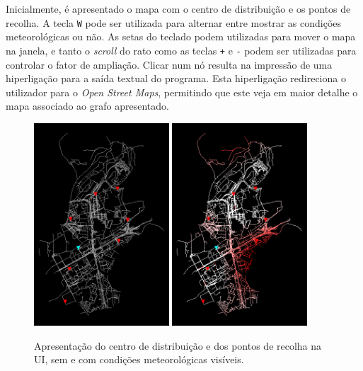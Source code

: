 \documentclass[12pt, a4paper]{article}
\begin{document}
Inicialmente, é apresentado o mapa com o centro de distribuição e os pontos de recolha. A tecla
\texttt{W} pode ser utilizada para alternar entre mostrar as condições meteorológicas ou não.
As setas do teclado podem utilizadas para mover o mapa na janela, e tanto o \emph{scroll} do rato
como as teclas \texttt{+} e \texttt{-} podem ser utilizadas para controlar o fator de ampliação.
Clicar num nó resulta na impressão de uma hiperligação para a saída textual do programa. Esta
hiperligação redireciona o utilizador para o \emph{Open Street Maps}, permitindo que este veja em
maior detalhe o mapa associado ao grafo apresentado.

\begin{figure}[H]
    \centering
    \includegraphics[width=0.45\textwidth]{res/PontosImportantes.png}
    \includegraphics[width=0.45\textwidth]{res/Tempo.png}
    \caption{
        Apresentação do centro de distribuição e dos pontos de recolha na UI, sem e com condições
        meteorológicas visíveis.
    }
\end{figure}
\end{document}
